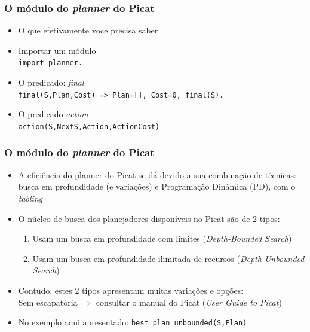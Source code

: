 \begin{frame}[fragile]
 \frametitle{O módulo do \textit{planner} do Picat}

\begin{itemize}
  \item O que efetivamente voce precisa saber
  \pause
  \item Importar um módulo \\
\texttt{import planner.}
  \pause
  \item O predicado: \textit{final}\\
    \texttt{final(S,Plan,Cost) => Plan=[], Cost=0, final(S).}
    \pause
  \item O predicado \textit{action}\\
    \texttt{action(S,NextS,Action,ActionCost)}

\end{itemize}
\end{frame}


\begin{frame}[fragile]
 \frametitle{O módulo do \textit{planner} do Picat}

\begin{itemize}

 \item A eficiência do planner do Picat se dá devido a sua combinação
       de técnicas: busca em profundidade (e variações) e Programação
       Dinâmica (PD), com o \textit{tabling}
  \pause 
  \item O núcleo de busca dos planejadores  disponíveis no Picat são de 2 tipos:
  \begin{enumerate}

    \item Usam um busca em profundidade com limites (\textit{Depth-Bounded Search})
    \item Usam um busca em profundidade ilimitada de recursos (\textit{Depth-Unbounded Search}) 
  \end{enumerate}
  
  \item Contudo, estes 2 tipos apresentam muitas variações e opções:\\
  \pause
  Sem escapatória $\Rightarrow $ consultar o manual do Picat (\textit{User Guide to Picat})
  
  \item No exemplo aqui apresentado: 
  \texttt{best\_plan\_unbounded(S,Plan)}   
\end{itemize}
\end{frame}




